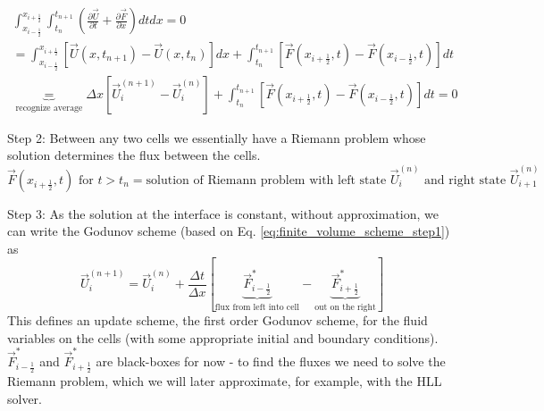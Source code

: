 \begin{equation}
    \begin{gathered}
        \int_{x_{i-\frac{1}{2}}}^{x_{i+\frac{1}{2}}} \int_{t_n}^{t_{n+1}}\left(\frac{\partial \vec{U}}{\partial t}+\frac{\partial \vec{F}}{\partial x}\right) d t d x=0 \\
        = \int_{x_{i-\frac{1}{2}}}^{x_{i+\frac{1}{2}}}\left[\vec{U}\left(x, t_{n+1}\right)-\vec{U}\left(x, t_n\right)\right] d x+\int_{t_n}^{t_{n+1}}\left[\vec{F}\left(x_{i+\frac{1}{2}}, t\right)-\vec{F}\left(x_{i-\frac{1}{2}}, t\right)\right] dt \\
        \underbrace{=}_{\text{recognize average}} \Delta x\left[\vec{U}_i^{(n+1)}-\vec{U}_i^{(n)}\right]+\int_{t_n}^{t_{n+1}}\left[\vec{F}\left(x_{i+\frac{1}{2}}, t\right)-\vec{F}\left(x_{i-\frac{1}{2}}, t\right)\right] d t=0
    \end{gathered}
    \label{eq:finite_volume_scheme_step1}
\end{equation}

\textcolor{blue1}{Step 2}: \textcolor{blue1}{Between any two cells we essentially have a Riemann problem whose solution determines the flux between the cells}.
\begin{equation}
    \vec{F}(x_{i+\frac{1}{2}},t) \text{ for } t > t_n = \text{solution of Riemann problem with left state } \vec{U}_i^{(n)} \text{ and right state } \vec{U}_{i+1}^{(n)}
\end{equation}
\begin{mdframed}[style=padded]
    \textcolor{blue1}{Step 3}: As the solution at the interface is constant, without approximation, we can write the \textcolor{blue1}{Godunov scheme} (based on Eq. \ref{eq:finite_volume_scheme_step1}) as
    \begin{equation}
        \vec{U}_i^{(n+1)}=\vec{U}_i^{(n)}+\frac{\Delta t}{\Delta x}\left[\underbrace{\vec{F}^*_{i-\frac{1}{2}}}_{\text{flux from left into cell}}-\underbrace{\vec{F}^*_{i+\frac{1}{2}}}_{\text{out on the right}}\right]
    \end{equation}
    This defines an update scheme, the first order Godunov scheme, for the fluid variables on the cells (with some appropriate initial and boundary conditions). $\vec{F}^*_{i-\frac{1}{2}}$ and $\vec{F}^*_{i+\frac{1}{2}}$ are black-boxes for now - to find the fluxes we need to solve the Riemann problem, which we will later approximate, for example, with the HLL solver.
\end{mdframed}

